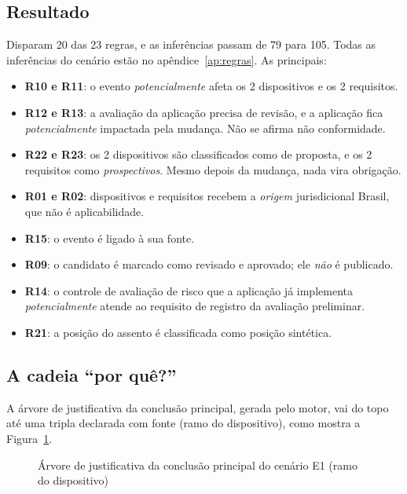 \documentclass[12pt,a4paper,oneside,english,brazil]{abntex2}
\begin{document}
\subsection{Resultado}
Disparam 20 das 23 regras, e as inferências passam de 79 para 105. Todas as inferências do cenário estão no apêndice~\ref{ap:regras}. As principais:
\begin{itemize}[leftmargin=*]
  \item \textbf{R10 e R11}: o evento \emph{potencialmente} afeta os 2 dispositivos e os 2 requisitos.
  \item \textbf{R12 e R13}: a avaliação da aplicação precisa de revisão, e a aplicação fica \emph{potencialmente} impactada pela mudança. Não se afirma não conformidade.
  \item \textbf{R22 e R23}: os 2 dispositivos são classificados como de proposta, e os 2 requisitos como \emph{prospectivos}. Mesmo depois da mudança, nada vira obrigação.
  \item \textbf{R01 e R02}: dispositivos e requisitos recebem a \emph{origem} jurisdicional Brasil, que não é aplicabilidade.
  \item \textbf{R15}: o evento é ligado à sua fonte.
  \item \textbf{R09}: o candidato é marcado como revisado e aprovado; ele \emph{não} é publicado.
  \item \textbf{R14}: o controle de avaliação de risco que a aplicação já implementa \emph{potencialmente} atende ao requisito de registro da avaliação preliminar.
  \item \textbf{R21}: a posição do assento é classificada como posição sintética.
\end{itemize}

\subsection{A cadeia ``por quê?''}
A árvore de justificativa da conclusão principal, gerada pelo motor, vai do topo até uma tripla declarada com fonte (ramo do dispositivo), como mostra a Figura~\ref{fig:cadeia}.

\begin{figure}[htb]
\caption{Árvore de justificativa da conclusão principal do cenário E1 (ramo do dispositivo)}
\label{fig:cadeia}
\begin{minipage}{\linewidth}\small\SingleSpacing

\end{minipage}
\end{figure}
\end{document}
